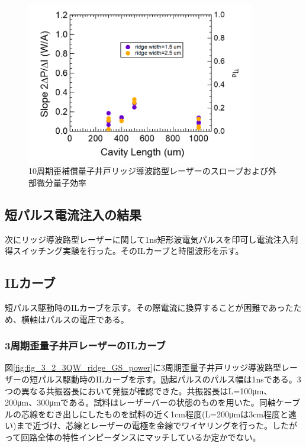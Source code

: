 {\begin{figure}[h]
	\centering
	\includegraphics[width=10cm]{figure/fig_3_2_10QW_ridge_slope.png}
		\caption{10周期歪補償量子井戸リッジ導波路型レーザーのスロープおよび外部微分量子効率}
		\label{fig:fig_3_2_10QW_ridge_slope}
\end{figure}
\clearpage
\subsection{短パルス電流注入の結果}

次にリッジ導波路型レーザーに関して1ns矩形波電気パルスを印可し電流注入利得スイッチング実験を行った。そのILカーブと時間波形を示す。
\subsection{ILカーブ}
短パルス駆動時のILカーブを示す。その際電流に換算することが困難であったため、横軸はパルスの電圧である。
\subsubsection{3周期歪量子井戸レーザーのILカーブ}
図\ref{fig:fig_3_2_3QW_ridge_GS_power}に3周期歪量子井戸リッジ導波路型レーザーの短パルス駆動時のILカーブを示す。励起パルスのパルス幅は1nsである。3つの異なる共振器長において発振が確認できた。共振器長はL=100\si{\micro\metre}、200\si{\micro\metre}、300\si{\micro\metre}である。試料はレーザーバーの状態のものを用いた。同軸ケーブルの芯線をむき出しにしたものを試料の近く1cm程度(L=200\si{\micro\metre}は3cm程度と遠い)まで近づけ、芯線とレーザーの電極を金線でワイヤリングを行った。したがって回路全体の特性インピーダンスにマッチしているか定かでない。

}
